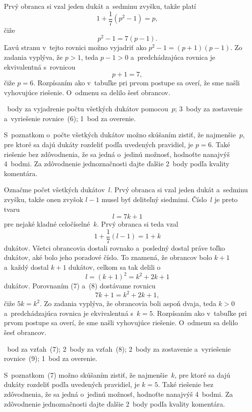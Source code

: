{Prvý obranca si vzal jeden dukát a~sedminu zvyšku, takže platí
$$
1+\frac17(p^2-1)=p, \tag{6}
$$
čiže
$$
p^2-1=7(p-1).
$$
Ľavú stranu v~tejto rovnici možno vyjadriť ako $p^2-1=(p+1)(p-1)$.
Zo zadania vyplýva, že $p>1$, teda $p-1>0$ a~predchádzajúca rovnica
je ekvivalentná s~rovnicou
$$
p+1=7,
$$
čiže $p=6$.
Rozpísaním ako v~tabuľke pri prvom postupe sa overí,
že sme našli vyhovujúce riešenie.
O~odmenu sa delilo šesť obrancov.

~body za vyjadrenie počtu všetkých dukátov pomocou~$p$;
3~body za zostavenie a~vyriešenie rovnice~(6);
1~bod za overenie.

S~poznatkom o~počte všetkých dukátov možno skúšaním zistiť, že
najmenšie~$p$, pre ktoré sa dajú dukáty rozdeliť podľa uvedených pravidiel,
je $p=6$. Také riešenie bez zdôvodnenia, že sa jedná o~jedinú možnosť,
hodnoťte nanajvýš 4~bodmi. Za zdôvodnenie jednoznačnosti dajte ďalšie
2~body podľa kvality komentára.
\endhodnotenie

\ineriesenie
Označme počet všetkých dukátov~$l$.
Prvý obranca si vzal jeden dukát a~sedminu zvyšku, takže onen zvyšok $l-1$ musel byť deliteľný siedmimi.
Číslo~$l$ je preto tvaru
$$
l=7k+1 \tag{7}
$$
pre nejaké kladné celočíselné~$k$.
Prvý obranca si teda vzal
$$
1+\frac17(l-1)=1+k
$$
dukátov.
Všetci obrancovia dostali rovnako a~posledný dostal práve toľko dukátov, aké bolo jeho poradové číslo.
To znamená, že obrancov bolo $k+1$ a~každý dostal $k+1$ dukátov, celkom sa tak delili
o~$$
l=(k+1)^2=k^2+2k+1 \tag{8}
$$
dukátov.
Porovnaním (7) a~(8) dostávame rovnicu
$$
7k+1=k^2+2k+1, \tag{9}
$$
čiže $5k=k^2$.
Zo zadania vyplýva, že obrancovia boli aspoň dvaja, teda $k>0$ a~predchádzajúca rovnica je ekvivalentná s~$k=5$.
Rozpísaním ako v~tabuľke pri prvom postupe sa overí, že sme našli vyhovujúce riešenie.
O~odmenu sa delilo šesť obrancov.

~bod za vzťah~(7);
2~body za vzťah~(8);
2~body za zostavenie a~vyriešenie rovnice~(9);
1~bod za overenie.

S~poznatkom~(7) možno skúšaním zistiť, že najmenšie~$k$, pre ktoré sa dajú dukáty rozdeliť podľa uvedených pravidiel, je $k=5$.
Také riešenie bez zdôvodnenia, že sa jedná o~jedinú možnosť, hodnoťte nanajvýš 4~bodmi.
Za zdôvodnenie jednoznačnosti dajte ďalšie 2~body podľa kvality komentára.
\endhodnotenie
}

